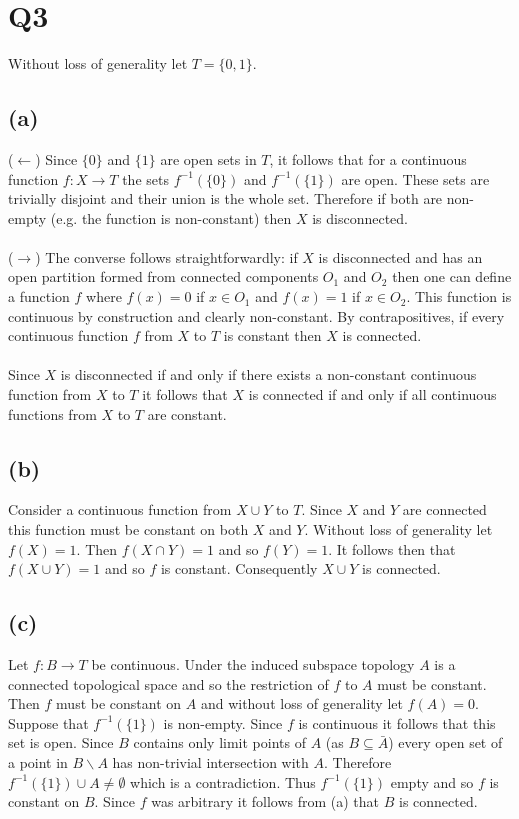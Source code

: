 \documentclass{article}
\begin{document}
\section*{Q3}
Without loss of generality let $T = \{0,1\}$.

\subsection*{(a)}
($\leftarrow$) Since $\{0\}$ and $\{1\}$ are open sets in $T$, it follows that for a continuous function $f:X\rightarrow T$ the 
sets $f^{-1}(\{0\})$ and $f^{-1}(\{1\})$ are open. These sets are trivially disjoint and their 
union is the whole set. Therefore if both are non-empty (e.g. the function is non-constant) then 
$X$ is disconnected. 

\paragraph{}
($\rightarrow$) The converse follows straightforwardly: if $X$ is disconnected and has an open partition formed 
from connected components $O_1$ and $O_2$ then one can define a function $f$ where $f(x) = 0$ 
if $x \in O_1$ and $f(x) = 1$ if $x \in O_2$. This function is continuous by construction and 
clearly non-constant. By contrapositives, if every continuous function $f$ from $X$ to $T$ is 
constant then $X$ is connected.

\paragraph{}
Since $X$ is disconnected if and only if there exists a non-constant continuous function from $X$ 
to $T$ it follows that $X$ is connected if and only if all continuous functions from $X$ to $T$ 
are constant.

\subsection*{(b)}
Consider a continuous function from $X\cup Y$ to $T$. Since $X$ and $Y$ 
are connected this function must be constant on both $X$ and $Y$. Without loss of generality 
let $f(X) = 1$. Then $f(X\cap Y) = 1$ and so $f(Y) = 1$. It follows then that $f(X \cup Y) =1$ 
and so $f$ is constant. Consequently $X \cup Y$ is connected.

\subsection*{(c)}
Let $f:B\rightarrow T$ be continuous. Under the induced subspace topology $A$ is a connected 
topological space and so the restriction of $f$ to $A$ must be constant. Then $f$ must be constant on $A$ and without loss of generality 
let $f(A) = 0$. Suppose that $f^{-1}(\{1\})$ is non-empty. Since $f$ is continuous it follows 
that this set is open. Since $B$ contains only limit points of $A$ (as $B \subseteq \bar{A}$) every 
open set of a point in $B\backslash A$ has non-trivial intersection with $A$. Therefore $f^{-1}(\{1\}) \cup A \neq \emptyset$ 
which is a contradiction. Thus $f^{-1}(\{1\})$ empty and so $f$ is constant on $B$. Since $f$ was 
arbitrary it follows from (a) that $B$ is connected.
\end{document}

